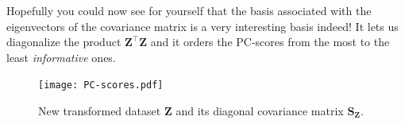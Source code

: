 \documentclass[10pt,twocolumn]{article}
\begin{document}
Hopefully you could now see for yourself that the basis associated with the eigenvectors of the covariance matrix is a very interesting basis indeed! It lets us diagonalize the product $\mathbf{Z}^{\top} \mathbf{Z}$ and it orders the PC-scores from the most to the least \textit{informative} ones.
\begin{figure}[t]
\centering\texttt{[image: PC-scores.pdf]}
\caption{New transformed dataset $\mathbf{Z}$ and its diagonal covariance matrix $\mathbf{S_Z}$.}
\label{fig:PC-scores}
\end{figure}

%
%
\end{document}
